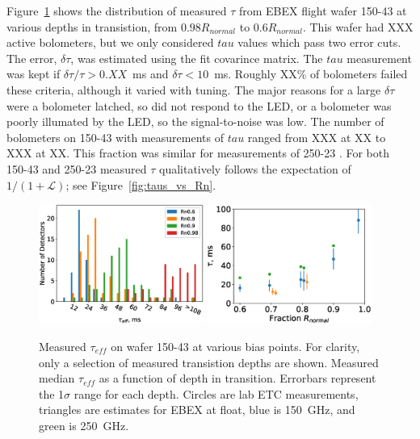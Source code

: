 \documentclass[../EBEXPaper2.tex]{subfiles}
\begin{document}
Figure~\ref{fig:LED_taus} shows the distribution of measured $\tau$ from \ac{EBEX} flight wafer 150-43 at various depths in 
transistion, from $0.98 R_{normal}$ to $0.6 R_{normal}$. 
This wafer had XXX active bolometers, but we only considered $tau$ values which pass two error cuts.  
The error, $\delta \tau$, was estimated using the fit covarince matrix.  The $tau$ measurement was kept if 
$\delta \tau / \tau > 0.XX$~ms and $\delta \tau < 10$~ms. Roughly XX\% of bolometers failed these criteria, although it 
varied with tuning.  The major reasons for a large $\delta\tau$ were a bolometer latched, so did not respond to the LED, 
or a bolometer was poorly illumated by the LED, so the signal-to-noise was low.
The number of bolometers on 150-43 with measurements of $tau$ ranged from XXX at XX to XXX at XX. This fraction was 
similar for measurements of 250-23 .
For both 150-43 and 250-23 measured $\tau$ qualitatively follows the expectation of $1/(1+\mathcal{L})$; see 
Figure~\ref{fig:taus_vs_Rn}.    

\begin{figure}[ht]
\center
\includegraphics[width=0.48\textwidth]{images/detectors_and_readout/tau_histograms}
\includegraphics[width=0.48\textwidth]{images/detectors_and_readout/tau_vs_Rn_median}
\caption{Measured $\tau_{eff}$ on wafer 150-43 at various bias points.  For clarity, only a selection of measured transistion 
         depths are shown. 
         Measured median $\tau_{eff}$ as a function of depth in transition.  Errorbars represent the 1$\sigma$ 
         range for each depth.  Circles are lab \ac{ETC} measurements, triangles are estimates for \ac{EBEX} at 
         float, blue is 150~GHz, and green is 250~GHz. 
         }
\label{fig:LED_taus}
\end{figure}
\end{document}

